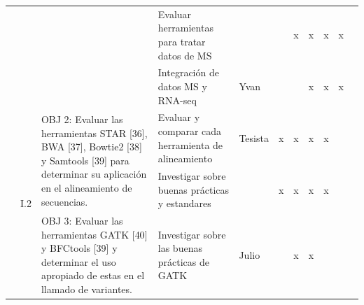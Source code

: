 \documentclass[a4paper,11pt]{article}
\begin{document}
\begin{table}[H]
\begin{tabular}{p{0.6cm}p{0.6cm}p{6cm}p{4cm}p{1cm}cccccc}
		&                       &                                                                                                                                                                                                                                                                                            & Evaluar herramientas para tratar datos de MS                                                         &                    &                       & \multicolumn{1}{c}{x}  & x                    & x                    & \multicolumn{1}{c}{x} &                        \\
		&                       &                                                                                                                                                                                                                                                                                            & Integración de datos  MS y RNA-seq                                                                   & Yvan               &                       &                        & x                    & x                    & \multicolumn{1}{c}{x} &                        \\ 
		& \multirow{5}{*}{I.2}  & \multirow{2}{6cm}{OBJ 2: Evaluar las herramientas STAR {[}36{]}, BWA {[}37{]}, Bowtie2 {[}38{]} y Samtools {[}39{]} para determinar su aplicación en el alineamiento de secuencias.}                                                                                                      & Evaluar y comparar cada herramienta de alineamiento                                                  & Tesista            & \multicolumn{1}{c}{x} & \multicolumn{1}{c}{x}  & x                    & x                    &                       &                        \\
		
		&                       &                                                                                                                                                                                                                                                                                            & Investigar sobre buenas prácticas y estandares                                                       &                    & \multicolumn{1}{c}{x} & \multicolumn{1}{c}{x}  & x                    & x                    &                       &                        \\
		&                       & \multirow{3}{6cm}{OBJ 3: Evaluar las herramientas GATK {[}40{]} y BFCtools {[}39{]} y determinar el uso apropiado de estas en el llamado de variantes.}                                                                                                                                   & Investigar sobre las buenas prácticas de GATK                                                        & Julio              &                       & \multicolumn{1}{c}{x}  & x                    & \multicolumn{1}{l}{} &                       &                        \\
		

\end{tabular}
\end{table}
\end{document}
